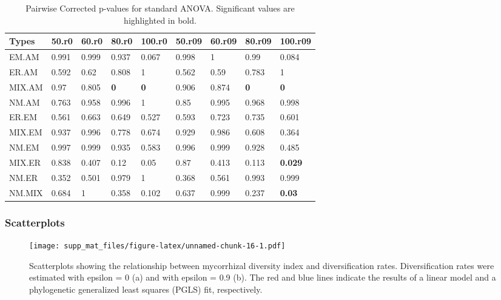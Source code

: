 \documentclass[]{article}
\begin{document}
\begin{table}[H]

\caption{\label{tab:unnamed-chunk-15}Pairwise Corrected p-values for standard ANOVA. Significant values are highlighted in bold.}
\centering
\begin{tabular}{l|l|l|l|l|l|l|l|l}
\hline
Types & 50.r0 & 60.r0 & 80.r0 & 100.r0 & 50.r09 & 60.r09 & 80.r09 & 100.r09\\
\hline
EM.AM & 0.991 & 0.999 & 0.937 & 0.067 & 0.998 & 1 & 0.99 & 0.084\\
\hline
ER.AM & 0.592 & 0.62 & 0.808 & 1 & 0.562 & 0.59 & 0.783 & 1\\
\hline
MIX.AM & 0.97 & 0.805 & \textbf{0} & \textbf{0} & 0.906 & 0.874 & \textbf{0} & \textbf{0}\\
\hline
NM.AM & 0.763 & 0.958 & 0.996 & 1 & 0.85 & 0.995 & 0.968 & 0.998\\
\hline
ER.EM & 0.561 & 0.663 & 0.649 & 0.527 & 0.593 & 0.723 & 0.735 & 0.601\\
\hline
MIX.EM & 0.937 & 0.996 & 0.778 & 0.674 & 0.929 & 0.986 & 0.608 & 0.364\\
\hline
NM.EM & 0.997 & 0.999 & 0.935 & 0.583 & 0.996 & 0.999 & 0.928 & 0.485\\
\hline
MIX.ER & 0.838 & 0.407 & 0.12 & 0.05 & 0.87 & 0.413 & 0.113 & \textbf{0.029}\\
\hline
NM.ER & 0.352 & 0.501 & 0.979 & 1 & 0.368 & 0.561 & 0.993 & 0.999\\
\hline
NM.MIX & 0.684 & 1 & 0.358 & 0.102 & 0.637 & 0.999 & 0.237 & \textbf{0.03}\\
\hline
\end{tabular}
\end{table}

\hypertarget{scatterplots-1}{%
\subsubsection{Scatterplots}\label{scatterplots-1}}

\begin{figure}
\centering
\texttt{[image: supp\_mat\_files/figure-latex/unnamed-chunk-16-1.pdf]}
\caption{Scatterplots showing the relationship between mycorrhizal
diversity index and diversification rates. Diversification rates were
estimated with epsilon = 0 (a) and with epsilon = 0.9 (b). The red and
blue lines indicate the results of a linear model and a phylogenetic
generalized least squares (PGLS) fit, respectively.}
\end{figure}
\end{document}
